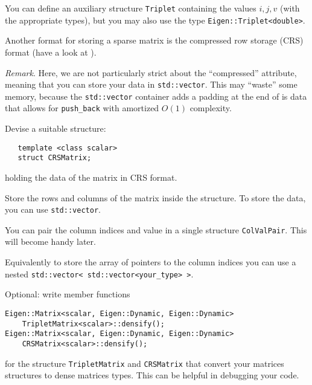 \begin{problem}
\begin{subproblem}[2]
  \begin{hint}
   You can define an auxiliary structure \verb|Triplet| containing the values
   $i,j,v$ (with the appropriate types), but you may also use the type
   \verb|Eigen::Triplet<double>|. 
  \end{hint}

 \end{subproblem}

 \begin{subproblem}[2]
   Another format for storing a sparse matrix is the compressed row storage (CRS)
   format (have a look at ). 

   \textit{Remark}. Here, we are not particularly strict about the ``compressed''
   attribute, meaning that you can store your data in \verb|std::vector|. This may
   ``waste'' some memory, because the \texttt{std::vector} container adds a
   padding at the end of is data that allows for \texttt{push\_back} with
   amortized $O(1)$ complexity.
 
   Devise a suitable structure:
\begin{verbatim}
   template <class scalar>
   struct CRSMatrix;
\end{verbatim}
   holding the data of the matrix in CRS format.
   
  \begin{hint}
   Store the rows and columns of the matrix inside the structure. To store the data, you can use \verb|std::vector|.
  \end{hint}
  
  \begin{hint}
   You can pair the column indices and value in a single structure \verb|ColValPair|. This will become handy later.
  \end{hint}
  
  \begin{hint}
   Equivalently to store the array of pointers to the column indices you can use a nested \verb|std::vector< std::vector<your_type> >|.
  \end{hint}

 \end{subproblem}
 
 \begin{subproblem}[3]
  Optional: write member functions
  \begin{verbatim}
Eigen::Matrix<scalar, Eigen::Dynamic, Eigen::Dynamic>
    TripletMatrix<scalar>::densify();
Eigen::Matrix<scalar, Eigen::Dynamic, Eigen::Dynamic>
    CRSMatrix<scalar>::densify();
  \end{verbatim}
  for the structure \verb|TripletMatrix| and \verb|CRSMatrix| that convert your matrices structures to \Eigen{} dense matrices types. This can be helpful in debugging your code.
 \end{subproblem}



\end{problem}
